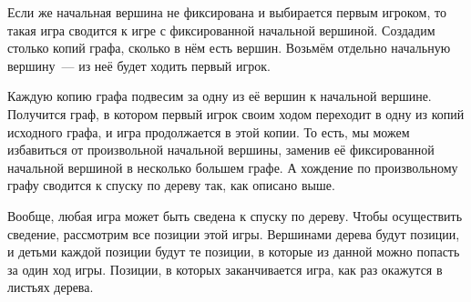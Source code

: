 \documentclass[a4paper,11pt]{article}
\begin{document}
Если же начальная вершина не фиксирована и выбирается первым игроком, то такая игра сводится к игре с фиксированной начальной вершиной. Создадим столько копий графа, сколько в нём есть вершин. Возьмём отдельно начальную вершину~— из неё будет ходить первый игрок.

Каждую копию графа подвесим за одну из её вершин к начальной вершине. Получится граф, в котором первый игрок своим ходом переходит в одну из копий исходного графа, и игра продолжается в этой копии. То есть, мы можем избавиться от произвольной начальной вершины, заменив её фиксированной начальной вершиной в несколько большем графе. А хождение по произвольному графу сводится к спуску по дереву так, как описано выше.

Вообще, любая игра может быть сведена к спуску по дереву. Чтобы осуществить сведение, рассмотрим все позиции этой игры. Вершинами дерева будут позиции, и детьми каждой позиции будут те позиции, в которые из данной можно попасть за один ход игры. Позиции, в которых заканчивается игра, как раз окажутся в листьях дерева.
\end{document}

